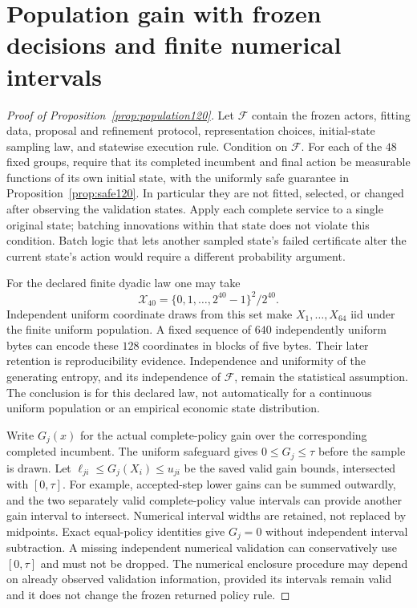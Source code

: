 \section{Population gain with frozen decisions and finite numerical intervals}
\label{supp:population120}
\begin{proof}[Proof of Proposition~\ref{prop:population120}]
Let $\mathcal F$ contain the frozen actors, fitting data,
proposal and refinement protocol, representation choices,
initial-state sampling law, and statewise execution rule.
Condition on $\mathcal F$.
For each of the $48$ fixed groups, require that its completed
incumbent and final action be measurable functions of its
own initial state, with the uniformly safe guarantee in
Proposition~\ref{prop:safe120}.
In particular they are not fitted, selected, or changed
after observing the validation states.  Apply each complete
service to a single original state; batching innovations
within that state does not violate this condition.
Batch logic that lets another sampled state's failed
certificate alter the current state's action would
require a different probability argument.

For the declared finite dyadic law one may take
\[
 \mathcal X_{40}
 =\{0,1,\ldots,2^{40}-1\}^2/2^{40}.
\]
Independent uniform coordinate draws from this set make
$X_1,\ldots,X_{64}$ iid under the finite uniform population.
A fixed sequence of $640$ independently uniform bytes
can encode these $128$ coordinates in blocks of five bytes.
Their later retention is reproducibility evidence.
Independence and uniformity of the generating entropy, and
its independence of $\mathcal F$, remain the statistical
assumption.  The conclusion is for this declared law, not
automatically for a continuous uniform population or an
empirical economic state distribution.

Write $G_j(x)$ for the actual complete-policy gain over
the corresponding completed incumbent.
The uniform safeguard gives $0\le G_j\le\tau$ before
the sample is drawn.  Let
$\ell_{ji}\le G_j(X_i)\le u_{ji}$
be the saved valid gain bounds, intersected with
$[0,\tau]$.  For example, accepted-step lower gains can
be summed outwardly, and the two separately valid
complete-policy value intervals can provide another gain
interval to intersect.  Numerical interval widths are
retained, not replaced by midpoints.  Exact equal-policy
identities give $G_j=0$ without independent interval
subtraction.  A missing independent numerical validation
can conservatively use $[0,\tau]$ and must not be dropped.
The numerical enclosure procedure may depend on already
observed validation information, provided its intervals
remain valid and it does not change the frozen returned
policy rule.


\end{proof}

